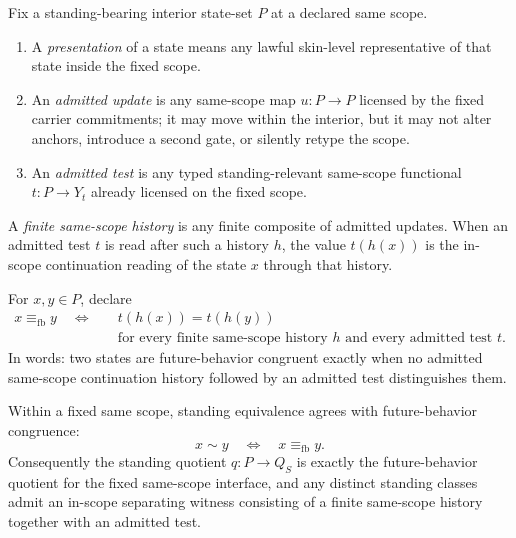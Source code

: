 \begin{definition}\label{def:same-scope-interface}
Fix a standing-bearing interior state-set $P$ at a declared same scope.
\begin{enumerate}[label=(\roman*), leftmargin=2.2em]
\item A \emph{presentation} of a state means any lawful skin-level representative of that state inside the fixed scope.
\item An \emph{admitted update} is any same-scope map $u:P\to P$ licensed by the fixed carrier commitments; it may move within the interior, but it may not alter anchors, introduce a second gate, or silently retype the scope.
\item An \emph{admitted test} is any typed standing-relevant same-scope functional $t:P\to Y_t$ already licensed on the fixed scope.
\end{enumerate}
A \emph{finite same-scope history} is any finite composite of admitted updates. When an admitted test $t$ is read after such a history $h$, the value $t(h(x))$ is the in-scope continuation reading of the state $x$ through that history.
\end{definition}

\begin{definition}\label{def:future-behavior-congruence}
For $x,y\in P$, declare
\[
\begin{aligned}
x\equiv_{\mathrm{fb}} y
\quad\Longleftrightarrow\quad
&t(h(x))=t(h(y))\\
&\text{for every finite same-scope history }h
\text{ and every admitted test }t.
\end{aligned}
\]
In words: two states are future-behavior congruent exactly when no admitted same-scope continuation history followed by an admitted test distinguishes them.
\end{definition}

\begin{theorem}[Standing quotient = future-behavior quotient]\label{thm:standing-quotient-future-behavior}
Within a fixed same scope, standing equivalence agrees with future-behavior congruence:
\[
x\sim y \quad\Longleftrightarrow\quad x\equiv_{\mathrm{fb}} y.
\]
Consequently the standing quotient $q:P\to Q_S$ is exactly the future-behavior quotient for the fixed same-scope interface, and any distinct standing classes admit an in-scope separating witness consisting of a finite same-scope history together with an admitted test.
\end{theorem}

